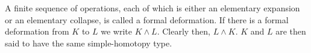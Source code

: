 A finite sequence of operations, each of which is either an elementary expansion or an elementary collapse, is called a formal deformation. If there is a formal deformation from $K$ to $L$ we write $K \wedge L$. Clearly then, $L \wedge K$. $K$ and $L$ are then said to have the same simple-homotopy type.
